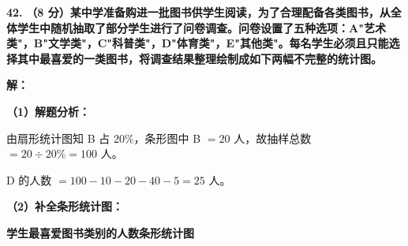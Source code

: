 \textbf{\LARGE 42.} \textbf{（8 分）某中学准备购进一批图书供学生阅读，为了合理配备各类图书，从全体学生中随机抽取了部分学生进行了问卷调查。问卷设置了五种选项：A"艺术类"，B"文学类"，C"科普类"，D"体育类"，E"其他类"。每名学生必须且只能选择其中最喜爱的一类图书，将调查结果整理绘制成如下两幅不完整的统计图。}

\vspace{0.4cm}
\textbf{解：}

\textbf{（1）解题分析：}

由扇形统计图知 B 占 $20\%$，条形图中 B $= 20$ 人，故抽样总数 $= 20 \div 20\% = 100$ 人。

D 的人数 $= 100 - 10 - 20 - 40 - 5 = 25$ 人。

\vspace{0.2cm}
\textbf{（2）补全条形统计图：}

\begin{center}
{\textbf{学生最喜爱图书类别的人数条形统计图}}
\end{center}

